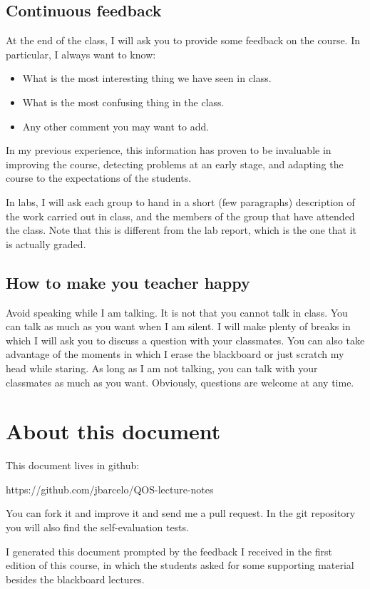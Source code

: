 \subsection{Continuous feedback}
At the end of the class, I will ask you to provide some feedback on the course. 
In particular, I always want to know:
\begin{itemize}
\item What is the most interesting thing we have seen in class.
\item What is the most confusing thing in the class.
\item Any other comment you may want to add.

\end{itemize}

In my previous experience, this information has proven to be invaluable in improving the course, detecting problems at an early stage, and adapting the course to the expectations of the students.

In labs, I will ask each group to hand in a short (few paragraphs) description of the work carried out in class, and the members of the group that have attended the class.
Note that this is different from the lab report, which is the one that it is actually graded.

\subsection{How to make you teacher happy}

Avoid speaking while I am talking.
It is not that you cannot talk in class.
You can talk as much as you want when I am silent.
I will make plenty of breaks in which I will ask you to discuss a question with your classmates.
You can also take advantage of the moments in which I erase the blackboard or just scratch my head while staring.
As long as I am not talking, you can talk with your classmates as much as you want.
Obviously, questions are welcome at any time.

\section{About this document}

This document lives in github:

https://github.com/jbarcelo/QOS-lecture-notes

You can fork it and improve it and send me a pull request. In the git repository you will also find the self-evaluation tests.

I generated this document prompted by the feedback I received in the first edition of this course, in which the students asked for some supporting material besides the blackboard lectures.
